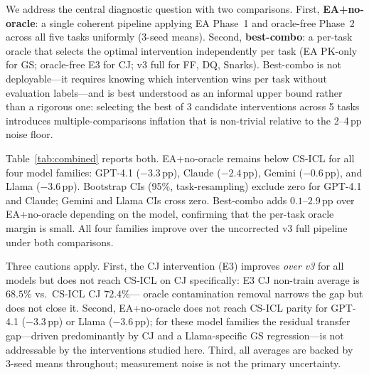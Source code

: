 \documentclass{article}
\begin{document}
We address the central diagnostic question with two comparisons.
First, \textbf{EA+no-oracle}: a single coherent pipeline applying EA Phase~1 and
oracle-free Phase~2 across all five tasks uniformly (3-seed means).
Second, \textbf{best-combo}: a per-task oracle that selects the optimal intervention
independently per task (EA PK-only for GS; oracle-free E3 for CJ; v3 full for FF, DQ, Snarks).
Best-combo is not deployable---it requires knowing which intervention wins per task without
evaluation labels---and is best understood as an informal upper bound rather than a
rigorous one: selecting the best of 3 candidate interventions across 5 tasks introduces
multiple-comparisons inflation that is non-trivial relative to the 2--4\,pp noise floor.

Table~\ref{tab:combined} reports both.
EA+no-oracle remains below CS-ICL for all four model families: GPT-4.1 ($-3.3$\,pp),
Claude ($-2.4$\,pp), Gemini ($-0.6$\,pp), and Llama ($-3.6$\,pp).
Bootstrap CIs (95\%, task-resampling) exclude zero for GPT-4.1 and Claude; Gemini and Llama
CIs cross zero.
Best-combo adds $0.1$--$2.9$\,pp over EA+no-oracle depending on the model, confirming
that the per-task oracle margin is small.
All four families improve over the uncorrected v3 full pipeline under both comparisons.

Three cautions apply.
First, the CJ intervention (E3) improves \emph{over v3} for all models but does not reach
CS-ICL on CJ specifically: E3 CJ non-train average is $68.5\%$ vs.\ CS-ICL CJ $72.4\%$---
oracle contamination removal narrows the gap but does not close it.
Second, EA+no-oracle does not reach CS-ICL parity for GPT-4.1 ($-3.3$\,pp) or Llama ($-3.6$\,pp);
for these model families the residual transfer gap---driven predominantly by CJ and a
Llama-specific GS regression---is not addressable by the interventions studied here.
Third, all averages are backed by 3-seed means throughout; measurement noise is not the
primary uncertainty.
\end{document}
